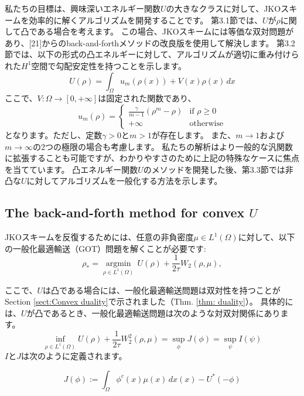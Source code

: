 \documentclass{jsarticle}
\theoremstyle{definition}
\begin{document}
私たちの目標は、興味深いエネルギー関数$U$の大きなクラスに対して、JKOスキームを効率的に解くアルゴリズムを開発することです。
第3.1節では、$U$が$\rho$に関して凸である場合を考えます。
この場合、JKOスキームには等価な双対問題があり、[21]からのback-and-forthメソッドの改良版を使用して解決します。
第3.2節では、以下の形式の凸エネルギーに対して、アルゴリズムが適切に重み付けられた$H^1$空間で勾配安定性を持つことを示します。
\[
    U(\rho) = \int_\Omega u_m(\rho(x)) + V(x)\rho(x) \, dx
\]
ここで、$V: \Omega \to [0, + \infty] $は固定された関数であり、
\begin{equation}
    \label{eq:u_m}
    u_m(\rho) = \begin{cases} \frac{\gamma}{m - 1}(\rho^m - \rho) & \text{if } \rho \geq 0 \\ +\infty & \text{otherwise} \end{cases}
\end{equation}
となります。ただし、定数\(\gamma > 0\)と\(m > 1\)が存在します。
また、$m \to 1$および$m \to \infty$の2つの極限の場合も考慮します。
私たちの解析はより一般的な汎関数に拡張することも可能ですが、わかりやすさのために上記の特殊なケースに焦点を当てています。
凸エネルギー関数$U$のメソッドを開発した後、第3.3節では非凸な$U$に対してアルゴリズムを一般化する方法を示します。


\subsection{The back-and-forth method for convex $U$}

JKOスキームを反復するためには、任意の非負密度$\mu \in L^1(\Omega)$に対して、以下の一般化最適輸送（GOT）問題を解くことが必要です:
\begin{equation}
\label{eq:GOT}
    \rho_* = \underset{\rho \in L^1(\Omega)} {\operatorname{argmin}}\,  U(\rho) + \frac{1}{2\tau}W_2(\rho,\mu),
\end{equation}

ここで、$U$は凸である場合には、一般化最適輸送問題は双対性を持つことがSection \ref{sect:Convex duality}で示されました（Thm. \ref{thm: duality}）。
具体的には、$U$が凸であるとき、一般化最適輸送問題は次のような対双対関係にあります。
$$
    \inf_{\rho \in L^1(\Omega)} U(\rho) + \frac{1}{2 \tau} W^2_2(\rho, \mu) = \sup_\phi J(\phi) = \sup_\psi I (\psi)
$$
$I$と$J$は次のように定義されます。


\begin{equation}
    \label{eq:J2}
    J(\phi):= \int_{\Omega} \phi^c(x) \mu(x) \,dx(x) - U^*(- \phi)
\end{equation}
\end{document}
